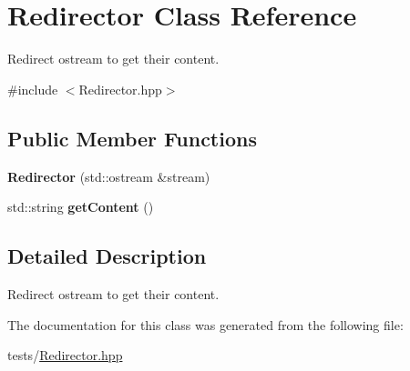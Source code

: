 \hypertarget{classRedirector}{}\section{Redirector Class Reference}
\label{classRedirector}


Redirect ostream to get their content.  




{\ttfamily \#include $<$Redirector.\+hpp$>$}

\subsection*{Public Member Functions}
\begin{DoxyCompactItemize}
\item 
\mbox{\label{classRedirector_a6137320fddd205c1d5b115ebf795c4e4}} 
{\bfseries Redirector} (std\+::ostream \&stream)
\item 
\mbox{\label{classRedirector_afdb8037990faef1a1893af8a9a7a36b6}} 
std\+::string {\bfseries get\+Content} ()
\end{DoxyCompactItemize}


\subsection{Detailed Description}
Redirect ostream to get their content. 

The documentation for this class was generated from the following file\+:\begin{DoxyCompactItemize}
\item 
tests/\hyperlink{Redirector_8hpp}{Redirector.\+hpp}\end{DoxyCompactItemize}
